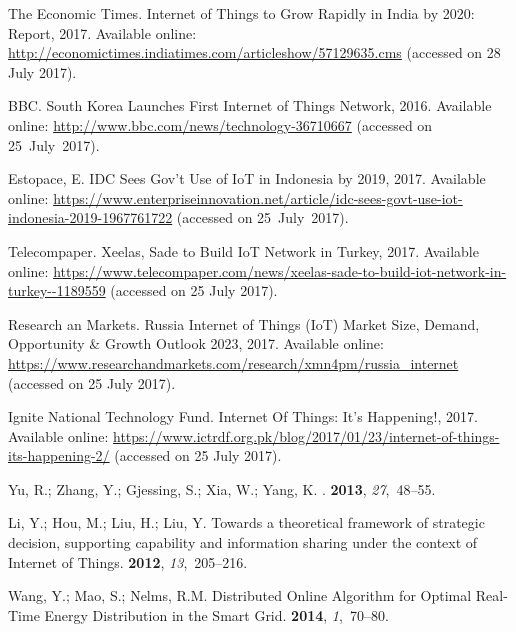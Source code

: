 \documentclass[symmetry,article,accept,moreauthors,pdftex10pt,a4paper]{mdpi}
\begin{document}
\begin{thebibliography}{999}
{The Economic Times}.
\newblock Internet of Things to Grow Rapidly in India by 2020: Report, 2017.
\newblock Available online: \url{http://economictimes.indiatimes.com/articleshow/57129635.cms} (accessed on 28 July 2017).

BBC.
\newblock South Korea Launches First Internet of Things Network, 2016.
\newblock Available online: \url{http://www.bbc.com/news/technology-36710667} (accessed on 25~July~2017).

Estopace, E.
\newblock IDC Sees Gov’t Use of IoT in Indonesia by 2019, 2017.
\newblock Available online: \url{https://www.enterpriseinnovation.net/article/idc-sees-govt-use-iot-indonesia-2019-1967761722} (accessed on 25~July~2017).

{Telecompaper}.
\newblock Xeelas, Sade to Build IoT Network in Turkey, 2017.
\newblock Available online: 
\url{https://www.telecompaper.com/news/xeelas-sade-to-build-iot-network-in-turkey--1189559} (accessed on 25 July 2017).

{Research an Markets}.
\newblock Russia Internet of Things (IoT) Market Size, Demand, Opportunity \&
Growth Outlook 2023, 2017.
\newblock Available online: \url{https://www.researchandmarkets.com/research/xmn4pm/russia_internet} (accessed on 25 July 2017).

{Ignite National Technology Fund}.
\newblock Internet Of Things: It’s Happening!, 2017.
\newblock Available online:
\url{https://www.ictrdf.org.pk/blog/2017/01/23/internet-of-things-its-happening-2/} (accessed on 25 July 2017).

Yu, R.; Zhang, Y.; Gjessing, S.; Xia, W.; Yang, K.
.
 {\bf {2013}}, {\em {27}},~{48--55}.

Li, Y.; Hou, M.; Liu, H.; Liu, Y.
\newblock Towards a theoretical framework of strategic decision, supporting
capability and information sharing under the context of Internet of Things.
 {\bf 2012}, {\em
	13},~205--216.

Wang, Y.; Mao, S.; Nelms, R.M.
\newblock Distributed Online Algorithm for Optimal Real-Time Energy
Distribution in the Smart Grid.
 {\bf 2014}, {\em 1},~70--80.


\end{thebibliography}
\end{document}
